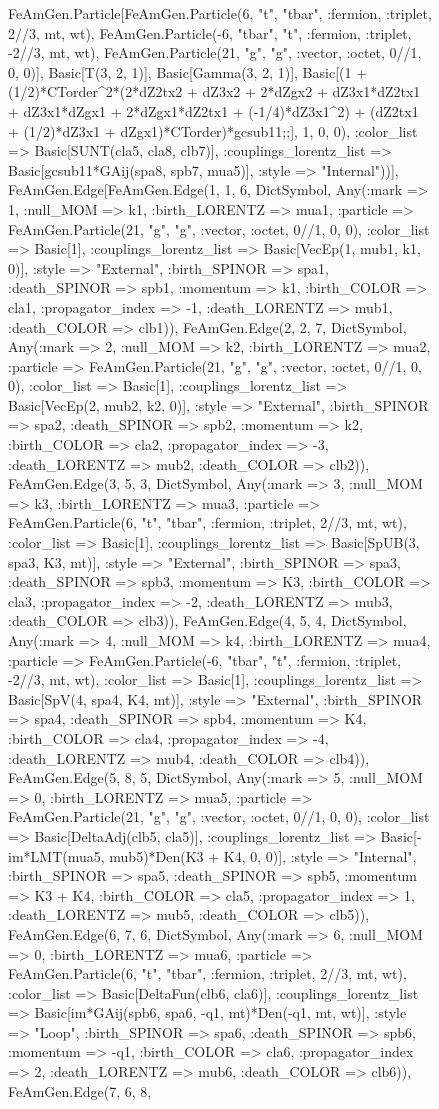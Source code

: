 \documentclass{revtex4}
\begin{document}
\begin{figure}[!htb]
\begin{center}
{FeAmGen.Particle[FeAmGen.Particle(6, "t", "tbar", :fermion, :triplet, 2//3, mt, wt), FeAmGen.Particle(-6, "tbar", "t", :fermion, :triplet, -2//3, mt, wt), FeAmGen.Particle(21, "g", "g", :vector, :octet, 0//1, 0, 0)], Basic[T(3, 2, 1)], Basic[Gamma(3, 2, 1)], Basic[(1 + (1/2)*CTorder^2*(2*dZ2tx2 + dZ3x2 + 2*dZgx2 + dZ3x1*dZ2tx1 + dZ3x1*dZgx1 + 2*dZgx1*dZ2tx1 + (-1/4)*dZ3x1^2) + (dZ2tx1 + (1/2)*dZ3x1 + dZgx1)*CTorder)*gcsub11;;], 1, 0, 0), :color_list => Basic[SUNT(cla5, cla8, clb7)], :couplings_lorentz_list => Basic[gcsub11*GAij(spa8, spb7, mua5)], :style => "Internal"))], FeAmGen.Edge[FeAmGen.Edge(1, 1, 6, Dict{Symbol, Any}(:mark => 1, :null_MOM => k1, :birth_LORENTZ => mua1, :particle => FeAmGen.Particle(21, "g", "g", :vector, :octet, 0//1, 0, 0), :color_list => Basic[1], :couplings_lorentz_list => Basic[VecEp(1, mub1, k1, 0)], :style => "External", :birth_SPINOR => spa1, :death_SPINOR => spb1, :momentum => k1, :birth_COLOR => cla1, :propagator_index => -1, :death_LORENTZ => mub1, :death_COLOR => clb1)), FeAmGen.Edge(2, 2, 7, Dict{Symbol, Any}(:mark => 2, :null_MOM => k2, :birth_LORENTZ => mua2, :particle => FeAmGen.Particle(21, "g", "g", :vector, :octet, 0//1, 0, 0), :color_list => Basic[1], :couplings_lorentz_list => Basic[VecEp(2, mub2, k2, 0)], :style => "External", :birth_SPINOR => spa2, :death_SPINOR => spb2, :momentum => k2, :birth_COLOR => cla2, :propagator_index => -3, :death_LORENTZ => mub2, :death_COLOR => clb2)), FeAmGen.Edge(3, 5, 3, Dict{Symbol, Any}(:mark => 3, :null_MOM => k3, :birth_LORENTZ => mua3, :particle => FeAmGen.Particle(6, "t", "tbar", :fermion, :triplet, 2//3, mt, wt), :color_list => Basic[1], :couplings_lorentz_list => Basic[SpUB(3, spa3, K3, mt)], :style => "External", :birth_SPINOR => spa3, :death_SPINOR => spb3, :momentum => K3, :birth_COLOR => cla3, :propagator_index => -2, :death_LORENTZ => mub3, :death_COLOR => clb3)), FeAmGen.Edge(4, 5, 4, Dict{Symbol, Any}(:mark => 4, :null_MOM => k4, :birth_LORENTZ => mua4, :particle => FeAmGen.Particle(-6, "tbar", "t", :fermion, :triplet, -2//3, mt, wt), :color_list => Basic[1], :couplings_lorentz_list => Basic[SpV(4, spa4, K4, mt)], :style => "External", :birth_SPINOR => spa4, :death_SPINOR => spb4, :momentum => K4, :birth_COLOR => cla4, :propagator_index => -4, :death_LORENTZ => mub4, :death_COLOR => clb4)), FeAmGen.Edge(5, 8, 5, Dict{Symbol, Any}(:mark => 5, :null_MOM => 0, :birth_LORENTZ => mua5, :particle => FeAmGen.Particle(21, "g", "g", :vector, :octet, 0//1, 0, 0), :color_list => Basic[DeltaAdj(clb5, cla5)], :couplings_lorentz_list => Basic[-im*LMT(mua5, mub5)*Den(K3 + K4, 0, 0)], :style => "Internal", :birth_SPINOR => spa5, :death_SPINOR => spb5, :momentum => K3 + K4, :birth_COLOR => cla5, :propagator_index => 1, :death_LORENTZ => mub5, :death_COLOR => clb5)), FeAmGen.Edge(6, 7, 6, Dict{Symbol, Any}(:mark => 6, :null_MOM => 0, :birth_LORENTZ => mua6, :particle => FeAmGen.Particle(6, "t", "tbar", :fermion, :triplet, 2//3, mt, wt), :color_list => Basic[DeltaFun(clb6, cla6)], :couplings_lorentz_list => Basic[im*GAij(spb6, spa6, -q1, mt)*Den(-q1, mt, wt)], :style => "Loop", :birth_SPINOR => spa6, :death_SPINOR => spb6, :momentum => -q1, :birth_COLOR => cla6, :propagator_index => 2, :death_LORENTZ => mub6, :death_COLOR => clb6)), FeAmGen.Edge(7, 6, 8, }
\end{center}
\end{figure}
\end{document}
